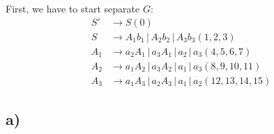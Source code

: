 First, we have to start separate $G$:
\begin{equation*}
\begin{split}
	S' &\rightarrow S  (0)\\
	S &\rightarrow A_1b_1 \,|\, A_2b_2 \,|\, A_3b_3 (1, 2, 3)\\
	A_1 &\rightarrow a_2A_1 \,|\, a_3A_1 \,|\, a_2 \,|\, a_3 (4, 5, 6, 7)\\
	A_2 &\rightarrow a_1A_2 \,|\, a_3A_2 \,|\, a_1 \,|\, a_3 (8, 9, 10, 11)\\
	A_3 &\rightarrow a_1A_3 \,|\, a_2A_3 \,|\, a_1 \,|\, a_2 (12, 13, 14, 15)
\end{split}
\end{equation*}

\subsection*{a)}

